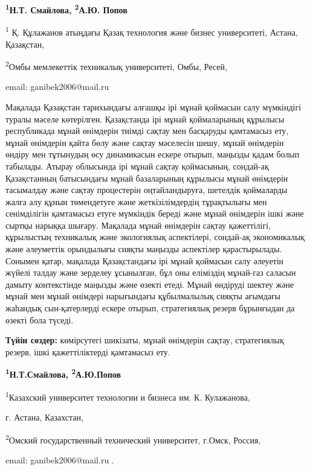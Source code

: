 \begin{center}
{\bfseries \textsuperscript{1}Н.Т. Смайлова\envelope,
\textsuperscript{2}А.Ю. Попов}

\textsuperscript{1} Қ. Құлажанов атыңдағы Қазақ технология және бизнес
университеті, Астана, Қазақстан,

\textsuperscript{2}Омбы мемлекеттік техникалық университеті, Омбы,
Ресей,

email: ganibek2006@mail.ru
\end{center}

Мақалада Қазақстан тарихындағы алғашқы ірі мұнай қоймасын салу
мүмкіндігі туралы мәселе көтерілген. Қазақстанда ірі мұнай қоймаларының
құрылысы республикада мұнай өнімдерін тиімді сақтау мен басқаруды
қамтамасыз ету, мұнай өнімдерін қайта бөлу және сақтау мәселесін шешу,
мұнай өнімдерін өндіру мен тұтынудың өсу динамикасын ескере отырып,
маңызды қадам болып табылады. Атырау облысында ірі мұнай сақтау
қоймасының, сондай-ақ Қазақстанның батысындағы мұнай базаларының
құрылысы мұнай өнімдерін тасымалдау және сақтау процестерін
оңтайландыруға, шетелдік қоймаларды жалға алу құнын төмендетуге және
жеткізілімдердің тұрақтылығы мен сенімділігін қамтамасыз етуге мүмкіндік
береді және мұнай өнімдерін ішкі және сыртқы нарыққа шығару. Мақалада
мұнай өнімдерін сақтау қажеттілігі, құрылыстың техникалық және
экологиялық аспектілері, сондай-ақ экономикалық және әлеуметтік
орындылығы сияқты маңызды аспектілер қарастырылады. Сонымен қатар,
мақалада Қазақстандағы ірі мұнай қоймасын салу әлеуетін жүйелі талдау
және зерделеу ұсынылған, бұл оны еліміздің мұнай-газ саласын дамыту
контекстінде маңызды және өзекті етеді. Мұнай өндіруді шектеу және мұнай
мен мұнай өнімдері нарығындағы құбылмалылық сияқты ағымдағы жаһандық
сын-қатерлерді ескере отырып, стратегиялық резерв бұрынғыдан да өзекті
бола түседі.

{\bfseries Түйін сөздер:} көмірсутегі шикізаты, мұнай өнімдерін сақтау,
стратегиялық резерв, ішкі қажеттіліктерді қамтамасыз ету.


\begin{center}
{\bfseries \textsuperscript{1}Н.Т.Смайлова\envelope,
\textsuperscript{2}А.Ю.Попов}

\textsuperscript{1}Казахский университет технологии и бизнеса им. К.
Кулажанова,

г. Астана, Казахстан,

\textsuperscript{2}Омский государственный технический университет,
г.Омск, Россия,

email: ganibek2006@mail.ru .
\end{center}

